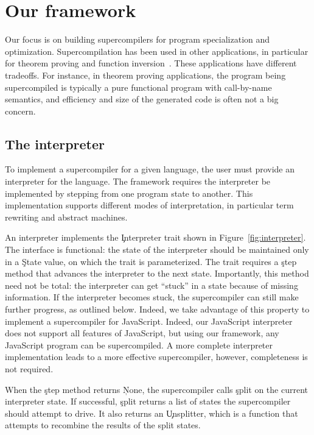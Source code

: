 \section{Our framework}
\label{sec:framework}

Our focus is on building supercompilers for program specialization and
optimization. Supercompilation has been used in other applications, in
particular for theorem proving and function inversion~\cite{mrsc}.
These applications have different tradeoffs. For instance, in theorem proving
applications, the program being supercompiled is 
typically a pure functional program with call-by-name semantics,
and efficiency and size of the generated code is often not a big concern.


\subsection{The interpreter}

To implement a supercompiler for a given language, the user must provide an
interpreter for the language. The framework requires the interpreter be
implemented by stepping from one program state to another. This implementation
supports different modes of interpretation, in particular term rewriting
and abstract machines.

An interpreter implements the \c{Interpreter} trait shown in Figure~\ref{fig:interpreter}.
The interface is functional: the state of the interpreter should 
be maintained only in a \c{State} value, on which the trait is parameterized.
The trait requires a \c{step} method
that advances the interpreter to the next state.
Importantly, 
this method need not be total:
the interpreter can get ``stuck'' in a state because of missing
information. If the interpreter becomes stuck, the supercompiler can
still make further progress, as outlined below.
Indeed, we take advantage of this property to implement
a supercompiler for JavaScript. Indeed, our JavaScript interpreter does not
support all features of JavaScript, but using our framework,
any JavaScript program can be supercompiled.
A more complete interpreter implementation leads to
a more effective supercompiler, however, completeness is not required.

When the \c{step} method returns \c{None}, the supercompiler calls \c{split}
on the current interpreter state.
If successful, \c{split} returns a list of states the supercompiler should 
attempt to drive. It also returns an \c{Unsplitter}, which is a function
that attempts to recombine the results of the split states.

